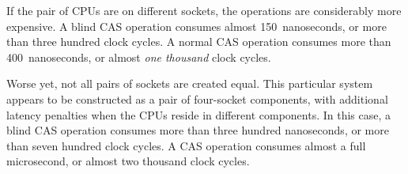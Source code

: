 If the pair of CPUs are on different sockets, the operations are considerably
more expensive.
A blind CAS operation consumes almost 150~nanoseconds, or more than
three hundred clock cycles.
A normal CAS operation consumes more than 400~nanoseconds, or almost
\emph{one thousand} clock cycles.

Worse yet, not all pairs of sockets are created equal.
This particular system appears to be constructed as a pair of four-socket
components, with additional latency penalties when the CPUs reside
in different components.
In this case, a blind CAS operation consumes more than three hundred
nanoseconds, or more than seven hundred clock cycles.
A CAS operation consumes almost a full microsecond, or almost two
thousand clock cycles.


